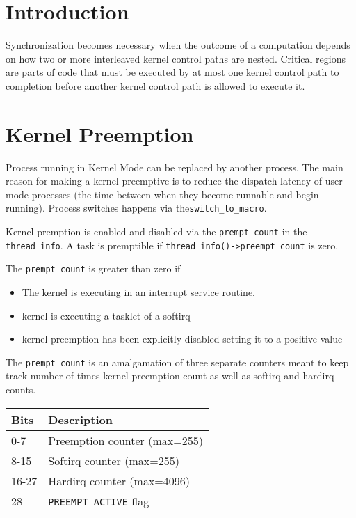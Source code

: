 \documentclass{article}
\begin{document}
\section{Introduction}

Synchronization becomes necessary when the outcome of a computation
depends on how two or more interleaved kernel control paths are
nested. Critical regions are parts of code that must be executed by at
most one kernel control path to completion before another kernel
control path is allowed to execute it.


\section{Kernel Preemption}

Process running in Kernel Mode can be replaced by another process.
The main reason for making a kernel preemptive is to reduce the
dispatch latency of user mode processes (the time between when they
become runnable and begin running).  Process switches happens via
the\lstinline{switch_to_macro}.

Kernel premption is enabled and disabled via the
\lstinline{prempt_count} in the \lstinline{thread_info}. A task is
premptible if \lstinline{thread_info()->preempt_count} is zero.

The \lstinline{prempt_count} is greater than zero if 

\begin{itemize}
\item The kernel is executing in an interrupt service routine.
\item kernel is executing a tasklet of a softirq
\item kernel preemption has been explicitly disabled setting it to a
  positive value
\end{itemize}


The \lstinline{prempt_count} is an amalgamation of three separate
counters meant to keep track number of times kernel preemption count
as well as softirq and hardirq counts.

\begin{center}
  \begin{tabular}{ l | l }    
    \hline
    Bits & Description                    \\ \hline
    0-7 & Preemption counter (max=255)    \\ 
    8-15 & Softirq counter (max=255)      \\ 
    16-27 &  Hardirq counter (max=4096)   \\ 
    28 & \lstinline{PREEMPT_ACTIVE} flag  \\ \hline
  \end{tabular}
\end{center}
\end{document}

